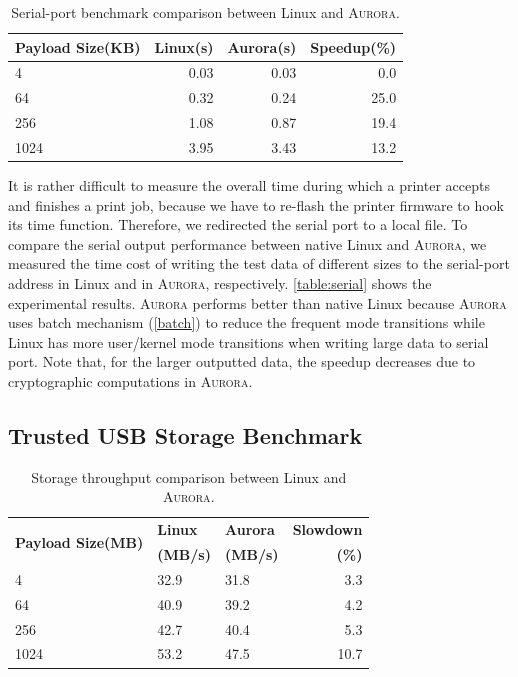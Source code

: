 \begin{table}[h]
	\centering
	\caption{Serial-port benchmark comparison between Linux and \textsc{Aurora}.}
	\label{table:serial}
	\small
	\begin{tabular}{lrrr}
		\toprule
		\textbf{Payload Size(KB)} & \textbf{Linux(s)} & \textbf{Aurora(s)} & \textbf{Speedup(\%)} \\
		\midrule
		4 & 0.03 & 0.03 & 0.0 \\
		64 & 0.32 & 0.24 & 25.0 \\
		256 & 1.08 & 0.87 & 19.4 \\
		1024 & 3.95 & 3.43 & 13.2 \\
		\bottomrule
	\end{tabular}
\end{table}

It is rather difficult to measure the overall time during which a printer accepts and finishes a print job, because we have to re-flash the printer firmware to hook its time function. Therefore, we redirected the serial port to a local file. 
To compare the serial output performance between native Linux and \textsc{Aurora}, we measured the time cost of writing the test data of different sizes to the serial-port address in Linux and in \textsc{Aurora}, respectively. \autoref{table:serial} shows the experimental results. \textsc{Aurora} performs better than native Linux because \textsc{Aurora} uses batch mechanism (\autoref{batch}) to reduce the frequent mode transitions while Linux has more user/kernel mode transitions when writing large data to serial port. Note that, for the larger outputted data, the speedup decreases due to cryptographic computations in \textsc{Aurora}.

\subsection{Trusted USB Storage Benchmark}

\begin{table}[h]	
	\centering
	\caption{Storage throughput comparison between Linux and \textsc{Aurora}.}
	\label{table:dd}
	\small
	\begin{tabular}{lllr}
		\toprule
		\multirow{2}{*}{\textbf{Payload Size(MB)}} & \textbf{Linux} & \textbf{Aurora} & \textbf{Slowdown} \\ 
		& \textbf{(MB/s)} & \textbf{(MB/s)} & \textbf{(\%)} \\
		\midrule
		4 & 32.9 & 31.8 & 3.3 \\
		64 & 40.9 & 39.2 & 4.2 \\
		256 & 42.7 & 40.4 & 5.3 \\
		1024 & 53.2 & 47.5 & 10.7 \\
		\bottomrule
	\end{tabular}
\end{table}


